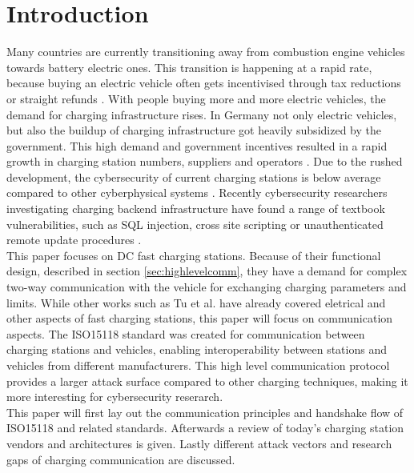 \documentclass[conference,flushend]{iaria} %
\begin{document}
\section{Introduction}
Many countries are currently transitioning away from combustion engine vehicles towards battery electric ones.
This transition is happening at a rapid rate, because buying an electric vehicle often gets incentivised through tax reductions or straight refunds \cite{kraftfahrtbundesamt_anzahl_2024}.
With people buying more and more electric vehicles, the demand for charging infrastructure rises.
In Germany not only electric vehicles, but also the buildup of charging infrastructure got heavily subsidized by the government.
This high demand and government incentives resulted in a rapid growth in charging station numbers, suppliers and operators \cite{bundesnetzagentur_anzahl_2024}.
Due to the rushed development, the cybersecurity of current charging stations is below average compared to other cyberphysical systems \cite{nasr_power_2022, johnson_review_2022, ahalawat_security_2022}.
Recently cybersecurity researchers investigating charging backend infrastructure have found a range of textbook vulnerabilities, such as SQL injection, cross site scripting or unauthenticated remote update procedures \cite{nasr_power_2022}.
\\
This paper focuses on DC fast charging stations. Because of their functional design, described in section \ref{sec:highlevelcomm}, they have a demand for complex two-way communication with the vehicle for exchanging charging parameters and limits.
While other works such as Tu et al. \cite{tu_extreme_2019} have already covered eletrical and other aspects of fast charging stations, this paper will focus on communication aspects.
The ISO15118 standard was created for communication between charging stations and vehicles, enabling interoperability between stations and vehicles from different manufacturers.
This high level communication protocol provides a larger attack surface compared to other charging techniques, making it more interesting for cybersecurity reserarch. \\
This paper will first lay out the communication principles and handshake flow of ISO15118 and related standards.
Afterwards a review of today's charging station vendors and architectures is given.
Lastly different attack vectors and research gaps of charging communication are discussed.
\end{document}
